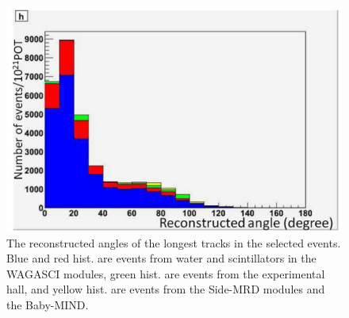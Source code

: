 \begin{figure}[tbh]
\begin{center}
\includegraphics[width=0.8\linewidth]{fig/angle_allcut_neutrino.pdf}
\end{center}
\caption{
The reconstructed angles of the longest tracks in the selected events.
Blue and red hist. are events from water and scintillators in the WAGASCI modules, green hist. are events from the experimental hall, and yellow hist. are events from the Side-MRD modules and the Baby-MIND.
}
\label{fig:angle_allcut_neutrino}
\end{figure}


